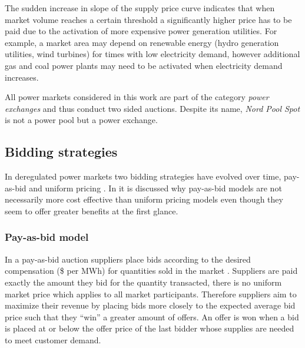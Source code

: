 The sudden increase in slope of the supply price curve indicates that when market volume reaches a certain threshold a significantly higher price has to be paid due to the activation of more expensive power generation utilities. For example, a market area may depend on renewable energy (hydro generation utilities, wind turbines) for times with low electricity demand, however additional gas and coal power plants may need to be activated when electricity demand increases. 

All power markets considered in this work are part of the category \textit{power exchanges} and thus conduct two sided auctions. Despite its name, \textit{Nord Pool Spot} is not a power pool but a power exchange. 



\subsection{Bidding strategies} \label{ssec:bidding_strategies}

In deregulated power markets two bidding strategies have evolved over time, pay-as-bid and uniform pricing \cite{weron2007modeling,tierney2008uniform}. In \cite{tierney2008uniform} it is discussed why pay-as-bid models are not necessarily more cost effective than uniform pricing models even though they seem to offer greater benefits at the first glance. 

\subsubsection{Pay-as-bid model}

In a pay-as-bid auction suppliers place bids according to the desired compensation (\$ per MWh) for quantities sold in the market \cite{tierney2008uniform}. Suppliers are paid exactly the amount they bid for the quantity transacted, there is no uniform market price which applies to all market participants. Therefore suppliers aim to maximize their revenue by placing bids more closely to the expected average bid price such that they "`win"' a greater amount of offers. An offer is won when a bid is placed at or below the offer price of the last bidder whose supplies are needed to meet customer demand. 

